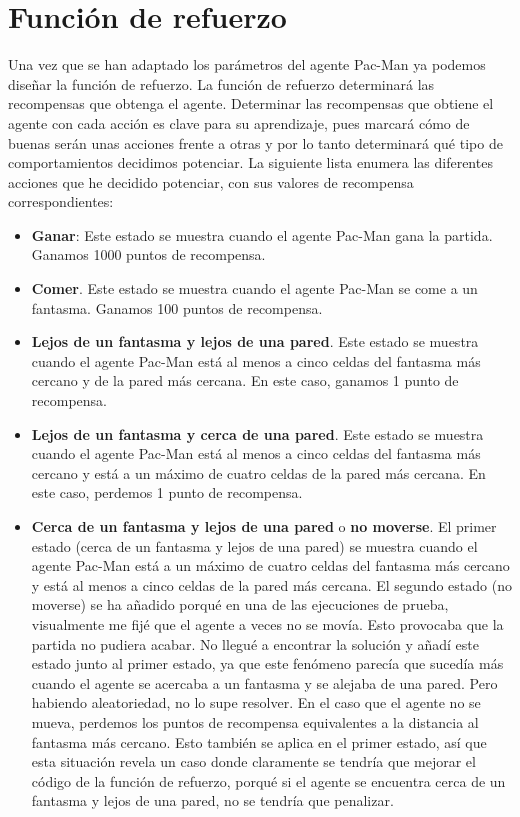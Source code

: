 \documentclass[11pt]{exam}
\begin{document}
\section{Función de refuerzo}\label{refuerzo}

Una vez que se han adaptado los parámetros del agente Pac-Man ya podemos diseñar la función de refuerzo. La función de refuerzo determinará las recompensas que obtenga el agente. Determinar las recompensas que obtiene el agente con cada acción es clave para su aprendizaje, pues marcará cómo de buenas serán unas acciones frente a otras y por lo tanto determinará qué tipo de comportamientos decidimos potenciar. La siguiente lista enumera las diferentes acciones que he decidido potenciar, con sus valores de recompensa correspondientes:

\begin{itemize}
	\item \textbf{Ganar}: Este estado se muestra cuando el agente Pac-Man gana la partida. Ganamos 1000 puntos de recompensa.
	
	\item \textbf{Comer}. Este estado se muestra cuando el agente Pac-Man se come a un fantasma. Ganamos 100 puntos de recompensa.
	
	\item \textbf{Lejos de un fantasma y lejos de una pared}. Este estado se muestra cuando el agente Pac-Man está al menos a cinco celdas del fantasma más cercano y de la pared más cercana. En este caso, ganamos 1 punto de recompensa.
	
	\item \textbf{Lejos de un fantasma y cerca de una pared}. Este estado se muestra cuando el agente Pac-Man está al menos a cinco celdas del fantasma más cercano y está a un máximo de cuatro celdas de la pared más cercana. En este caso, perdemos 1 punto de recompensa.
	
	\item \textbf{Cerca de un fantasma y lejos de una pared} o \textbf{no moverse}. El primer estado (cerca de un fantasma y lejos de una pared) se muestra cuando el agente Pac-Man está a un máximo de cuatro celdas del fantasma más cercano y está al menos a cinco celdas de la pared más cercana. El segundo estado (no moverse) se ha añadido porqué en una de las ejecuciones de prueba, visualmente me fijé que el agente a veces no se movía. Esto provocaba que la partida no pudiera acabar. No llegué a encontrar la solución y añadí este estado junto al primer estado, ya que este fenómeno parecía que sucedía más cuando el agente se acercaba a un fantasma y se alejaba de una pared. Pero habiendo aleatoriedad, no lo supe resolver. En el caso que el agente no se mueva, perdemos los puntos de recompensa equivalentes a la distancia al fantasma más cercano. Esto también se aplica en el primer estado, así que esta situación revela un caso donde claramente se tendría que mejorar el código de la función de refuerzo, porqué si el agente se encuentra cerca de un fantasma y lejos de una pared, no se tendría que penalizar.
	

\end{itemize}
\end{document}
